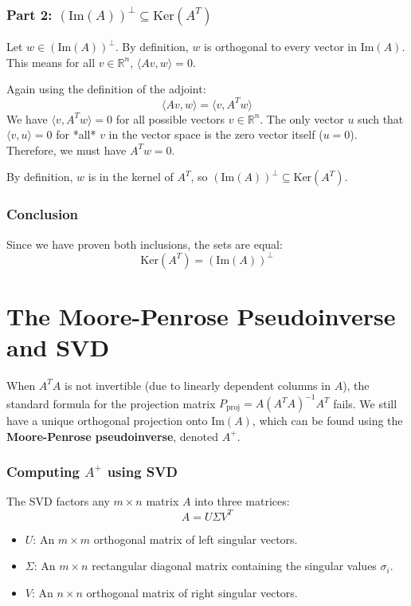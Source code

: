 \begin{notechapter}
\subsubsection*{Part 2: $(\text{Im}(A))^\perp \subseteq \text{Ker}(A^T)$}

Let $w \in (\text{Im}(A))^\perp$. By definition, $w$ is orthogonal to every vector in $\text{Im}(A)$. This means for all $v \in \mathbb{R}^n$, $\langle Av, w \rangle = 0$.

Again using the definition of the adjoint:
$$ \langle Av, w \rangle = \langle v, A^Tw \rangle $$
We have $\langle v, A^Tw \rangle = 0$ for all possible vectors $v \in \mathbb{R}^n$.
The only vector $u$ such that $\langle v, u \rangle = 0$ for *all* $v$ in the vector space is the zero vector itself ($u=0$).
Therefore, we must have $A^Tw = 0$.

By definition, $w$ is in the kernel of $A^T$, so $(\text{Im}(A))^\perp \subseteq \text{Ker}(A^T)$.

\subsubsection*{Conclusion}

Since we have proven both inclusions, the sets are equal:
$$ \text{Ker}(A^T) = (\text{Im}(A))^\perp $$

\section{The Moore-Penrose Pseudoinverse and SVD}

When $A^TA$ is not invertible (due to linearly dependent columns in $A$), the standard formula for the projection matrix $P_{\text{proj}} = A(A^TA)^{-1}A^T$ fails. We still have a unique orthogonal projection onto $\text{Im}(A)$, which can be found using the \textbf{Moore-Penrose pseudoinverse}, denoted $A^+$.

\subsubsection*{Computing $A^+$ using SVD}
The SVD factors any $m \times n$ matrix $A$ into three matrices:
$$A = U \Sigma V^T$$
\begin{itemize}
    \item $U$: An $m \times m$ orthogonal matrix of left singular vectors.
    \item $\Sigma$: An $m \times n$ rectangular diagonal matrix containing the singular values $\sigma_i$.
    \item $V$: An $n \times n$ orthogonal matrix of right singular vectors.
\end{itemize}


\end{notechapter}
